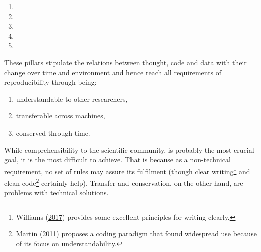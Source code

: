 \documentclass[12pt,a4paper,]{article}
\providecommand{\tightlist}{%
  \setlength{\itemsep}{0pt}\setlength{\parskip}{0pt}}
\begin{document}
\begin{enumerate}
\def\labelenumi{\arabic{enumi}.}
\item
\item
\item
\item
\item
\end{enumerate}

These pillars stipulate the relations between thought, code and data with their change over time and environment and hence reach all requirements of reproducibility through being:

\begin{enumerate}
\def\labelenumi{\arabic{enumi}.}
\tightlist
\item
  understandable to other researchers,
\item
  transferable across machines,
\item
  conserved through time.
\end{enumerate}

While comprehensibility to the scientific community, is probably the most crucial goal, it is the most difficult to achieve.
That is because as a non-technical requirement, no set of rules may assure its fulfilment (though clear writing\footnote{Williams (\protect\hyperlink{ref-williamsStyleLessonsClarity2017}{2017}) provides some excellent principles for writing clearly.} and clean code\footnote{Martin (\protect\hyperlink{ref-martinCleanCoderCode2011}{2011}) proposes a coding paradigm that found widespread use because of its focus on understandability.} certainly help).
Transfer and conservation, on the other hand, are problems with technical solutions.
\end{document}
